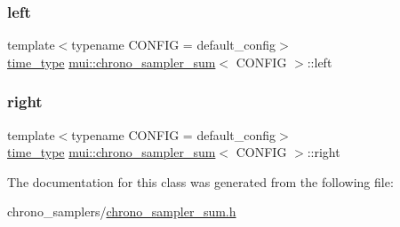 \subsubsection{\texorpdfstring{left}{left}}
{\footnotesize\ttfamily template$<$typename C\+O\+N\+F\+IG  = default\+\_\+config$>$ \\
\hyperlink{classmui_1_1chrono__sampler__sum_ada1a39bc0845e79c00e7aed8b55e8fb2}{time\+\_\+type} \hyperlink{classmui_1_1chrono__sampler__sum}{mui\+::chrono\+\_\+sampler\+\_\+sum}$<$ C\+O\+N\+F\+IG $>$\+::left\hspace{0.3cm}{\ttfamily [protected]}}

\mbox{\label{classmui_1_1chrono__sampler__sum_ac01675e14851c5b9ed2dfe1c2d3847d9}} 
\subsubsection{\texorpdfstring{right}{right}}
{\footnotesize\ttfamily template$<$typename C\+O\+N\+F\+IG  = default\+\_\+config$>$ \\
\hyperlink{classmui_1_1chrono__sampler__sum_ada1a39bc0845e79c00e7aed8b55e8fb2}{time\+\_\+type} \hyperlink{classmui_1_1chrono__sampler__sum}{mui\+::chrono\+\_\+sampler\+\_\+sum}$<$ C\+O\+N\+F\+IG $>$\+::right\hspace{0.3cm}{\ttfamily [protected]}}



The documentation for this class was generated from the following file\+:\begin{DoxyCompactItemize}
\item 
chrono\+\_\+samplers/\hyperlink{chrono__sampler__sum_8h}{chrono\+\_\+sampler\+\_\+sum.\+h}\end{DoxyCompactItemize}
